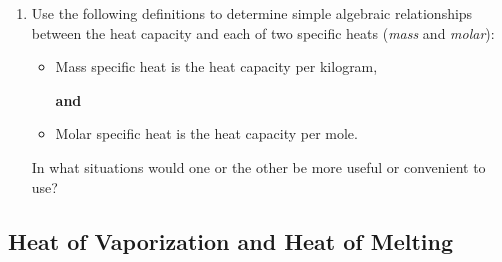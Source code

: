 \begin{enumerate}
		
	\item Use the following definitions to determine simple algebraic relationships between the heat capacity and each of two specific heats (\emph{mass} and \emph{molar}): 
	
	\begin{itemize}
		\item Mass specific heat is the heat capacity per kilogram,
		
		\textbf{and}
		
		\item Molar specific heat is the heat capacity per mole.
	\end{itemize}	

	In what situations would one or the other be more useful or convenient to use?
		
\end{enumerate}

\subsection{Heat of Vaporization and Heat of Melting}
\label{1.2.1B}

